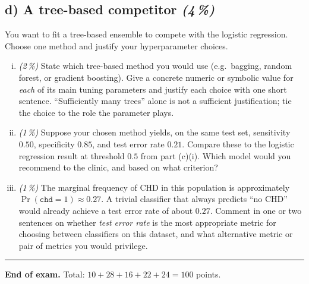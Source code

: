 \documentclass[11pt,a4paper]{article}
\newcommand{\subpoints}[1]{\textit{(#1\,\%)}}
\begin{document}
\subsection*{d) A tree-based competitor \subpoints{4}}

You want to fit a tree-based ensemble to compete with the logistic regression. Choose one method and justify your hyperparameter choices.

\begin{enumerate}[(i)]
  \item \subpoints{2} State which tree-based method you would use (e.g.\ bagging, random forest, or gradient boosting). Give a concrete numeric or symbolic value for \emph{each} of its main tuning parameters and justify each choice with one short sentence. ``Sufficiently many trees'' alone is not a sufficient justification; tie the choice to the role the parameter plays.
  \item \subpoints{1} Suppose your chosen method yields, on the same test set, sensitivity $0.50$, specificity $0.85$, and test error rate $0.21$. Compare these to the logistic regression result at threshold $0.5$ from part (c)(i). Which model would you recommend to the clinic, and based on what criterion?
  \item \subpoints{1} The marginal frequency of CHD in this population is approximately $\Pr(\texttt{chd}=1) \approx 0.27$. A trivial classifier that always predicts ``no CHD'' would already achieve a test error rate of about $0.27$. Comment in one or two sentences on whether \emph{test error rate} is the most appropriate metric for choosing between classifiers on this dataset, and what alternative metric or pair of metrics you would privilege.
\end{enumerate}

\vspace{1em}
\hrule
\vspace{0.5em}

\noindent\textbf{End of exam.} \quad Total: $10 + 28 + 16 + 22 + 24 = 100$ points.
\end{document}
